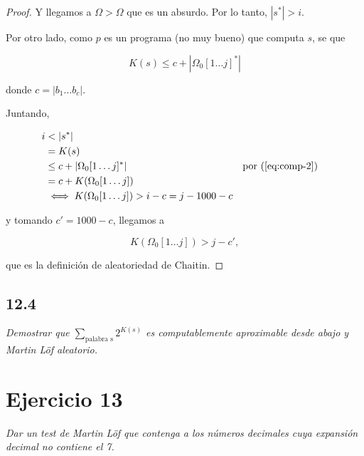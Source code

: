 \documentclass{article}
\theoremstyle{definition} %
\newcommand{\first}[2]{#2[1 \dots #1]}
\begin{document}
\begin{proof}
    Y llegamos a $\Omega > \Omega$ que es un absurdo. Por lo tanto, $|s^*| > i$.
    
    Por otro lado, como $p$ es un programa (no muy bueno) que computa $s$, se que

    \begin{equation}\label{eq:comp-2}
         K(s) \leq c + |\first{j}{\Omega_0}^*|
    \end{equation}

    donde $c = |b_1 \dots b_c|$.

    Juntando,

    \begin{align*}
        i
            &< |s^*|\\
            &= K(s)\\
            &\leq c + |\first{j}{\Omega_0}^*|
                &&\text{por (\ref{eq:comp-2})} \\
            &= c + K(\first{j}{\Omega_0}) \\
            &\iff K(\first{j}{\Omega_0}) > i - c = j - 1000 - c
    \end{align*}

     y tomando $c' = 1000 -
c$, llegamos a

    \[
        K(\first{j}{\Omega_0}) > j - c',
    \]
    
    que es la definición de aleatoriedad de Chaitin.

\end{proof}

\subsection*{12.4}

\textit{Demostrar que $\sum_{\text{palabra s}} 2^{K(s)}$ es computablemente
aproximable desde abajo y Martin Löf aleatorio.}

\section*{Ejercicio 13}

\textit{Dar un test de Martin Löf que contenga a los números decimales cuya expansión decimal no contiene el 7.}
\end{document}

